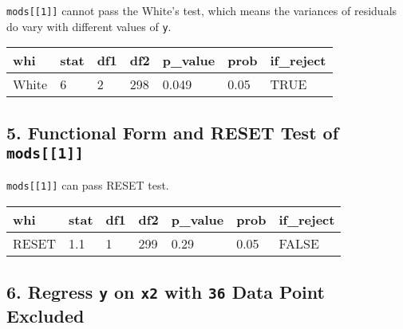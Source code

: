 \documentclass[main.tex]{subfiles}
\begin{document}
\texttt{mods{[}{[}1{]}{]}} cannot pass the White's test, which means the
variances of residuals do vary with different values of \texttt{y}.

\begin{Shaded}
\end{Shaded}

\begin{table}[H]
\centering
\begin{tabular}{lllllll}
\toprule
whi & stat & df1 & df2 & p\_value & prob & if\_reject\\
\midrule
White & 6 & 2 & 298 & 0.049 & 0.05 & TRUE\\
\bottomrule
\end{tabular}
\end{table}

\hypertarget{functional-form-and-reset-test-of-mods1}{%
\subsection{\texorpdfstring{5. Functional Form and RESET Test of
\texttt{mods{[}{[}1{]}{]}}}{5. Functional Form and RESET Test of mods{[}{[}1{]}{]}}}\label{functional-form-and-reset-test-of-mods1}}

\texttt{mods{[}{[}1{]}{]}} can pass RESET test.

\begin{table}[H]
\centering
\begin{tabular}{lllllll}
\toprule
whi & stat & df1 & df2 & p\_value & prob & if\_reject\\
\midrule
RESET & 1.1 & 1 & 299 & 0.29 & 0.05 & FALSE\\
\bottomrule
\end{tabular}
\end{table}

\hypertarget{regress-y-on-x2-with-36-data-point-excluded}{%
\subsection{\texorpdfstring{6. Regress \texttt{y} on \texttt{x2} with
\texttt{36} Data Point
Excluded}{6. Regress y on x2 with 36 Data Point Excluded}}\label{regress-y-on-x2-with-36-data-point-excluded}}
\end{document}

